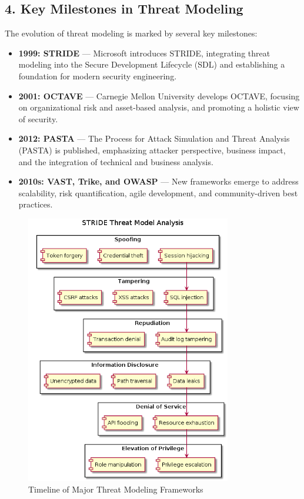 \subsection*{4. Key Milestones in Threat Modeling}
The evolution of threat modeling is marked by several key milestones:
\begin{itemize}
	\item \textbf{1999: STRIDE} — Microsoft introduces STRIDE, integrating threat modeling into the Secure Development Lifecycle (SDL) and establishing a foundation for modern security engineering\cite{shostack2014}.
	\item \textbf{2001: OCTAVE} — Carnegie Mellon University develops OCTAVE, focusing on organizational risk and asset-based analysis, and promoting a holistic view of security\cite{nist800154}.
	\item \textbf{2012: PASTA} — The Process for Attack Simulation and Threat Analysis (PASTA) is published, emphasizing attacker perspective, business impact, and the integration of technical and business analysis\cite{uceda2015}.
	\item \textbf{2010s: VAST, Trike, and OWASP} — New frameworks emerge to address scalability, risk quantification, agile development, and community-driven best practices\cite{owasp}.
\end{itemize}

\begin{figure}[H]
	\centering
	\includegraphics[width=0.8\textwidth]{images/stride-analysis}
	\caption{Timeline of Major Threat Modeling Frameworks}
\end{figure}

